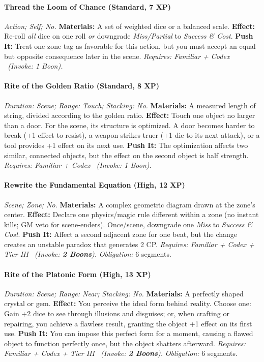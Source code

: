\paragraph{Thread the Loom of Chance (Standard, 7 XP)} \emph{Action; Self; No.}
\textbf{Materials:} A set of weighted dice or a balanced scale.
\textbf{Effect:} Re-roll \emph{all} dice on one roll \emph{or} downgrade \emph{Miss/Partial} to \emph{Success \& Cost}.
\textbf{Push It:} Treat one zone tag as favorable for this action, but you must accept an equal but opposite consequence later in the scene.
\emph{Requires: Familiar + Codex \ (\textit{Invoke:} 1 Boon).}
\paragraph{Rite of the Golden Ratio (Standard, 8 XP)} \emph{Duration: Scene; Range: Touch; Stacking: No.}
\textbf{Materials:} A measured length of string, divided according to the golden ratio.
\textbf{Effect:} Touch one object no larger than a door. For the scene, its structure is optimized. A door becomes harder to break (+1 effect to resist), a weapon strikes truer (+1 die to its next attack), or a tool provides +1 effect on its next use.
\textbf{Push It:} The optimization affects two similar, connected objects, but the effect on the second object is half strength.
\emph{Requires: Familiar + Codex \ (\textit{Invoke:} 1 Boon).}
\paragraph{Rewrite the Fundamental Equation (High, 12 XP)} \emph{Scene; Zone; No.}
\textbf{Materials:} A complex geometric diagram drawn at the zone's center.
\textbf{Effect:} Declare one physics/magic rule different within a zone (no instant kills; GM veto for scene-enders). Once/scene, downgrade one \emph{Miss} to \emph{Success \& Cost}.
\textbf{Push It:} Affect a second adjacent zone for one beat, but the change creates an unstable paradox that generates 2 CP.
\emph{Requires: Familiar + Codex + Tier III \ (\textit{Invoke:} \textbf{2 Boons}).}
\emph{Obligation:} 6 segments.

\paragraph{Rite of the Platonic Form (High, 13 XP)} \emph{Duration: Scene; Range: Near; Stacking: No.}
\textbf{Materials:} A perfectly shaped crystal or gem.
\textbf{Effect:} You perceive the ideal form behind reality. Choose one: Gain +2 dice to see through illusions and disguises; or, when crafting or repairing, you achieve a flawless result, granting the object +1 effect on its first use.
\textbf{Push It:} You can impose this perfect form for a moment, causing a flawed object to function perfectly once, but the object shatters afterward.
\emph{Requires: Familiar + Codex + Tier III \ (\textit{Invoke:} \textbf{2 Boons}).}
\emph{Obligation:} 6 segments.

